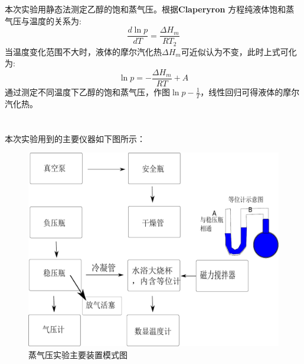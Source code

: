 \documentclass[10.5pt]{article}
\begin{document}
\title{\textbf{}} %
\author{}
\date{}
\maketitle
\section{\textbf{}}
本次实验用静态法测定乙醇的饱和蒸气压。根据\textbf{Claperyron} 方程纯液体饱和蒸气压与温度的关系为:
\begin{equation}
\frac{d \ln p}{dT}=\frac{\Delta H_m}{RT_2}
\end{equation}
当温度变化范围不大时，液体的摩尔汽化热$\Delta H_m$可近似认为不变，此时上式可化为:
\begin{equation}
\ln p=-\frac{\Delta H_m}{RT}+A
\end{equation}
通过测定不同温度下乙醇的饱和蒸气压，作图$\ln p-\frac{1}{T}$，线性回归可得液体的摩尔汽化热。
\section{\textbf{}}
\subsection{\textbf{}}
本次实验用到的主要仪器如下图所示：
\begin{figure}[!ht]
\centering
\caption{蒸气压实验主要装置模式图}
\includegraphics[width=350pt]{VaporTemperatureTest.pdf}
\end{figure}
\end{document}
